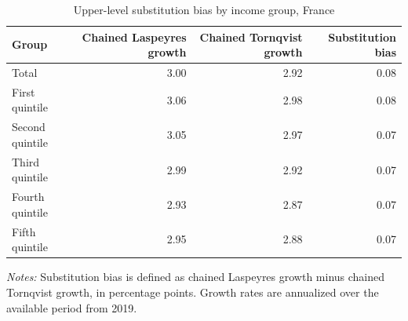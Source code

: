 \begin{table}

\caption{\label{tab:fr-substitution-bias}Upper-level substitution bias by income group, France}
\centering
\begin{tabular}[t]{lrrr}
\toprule
Group & Chained Laspeyres growth & Chained Tornqvist growth & Substitution bias\\
\midrule
Total & 3.00 & 2.92 & 0.08\\
First quintile & 3.06 & 2.98 & 0.08\\
Second quintile & 3.05 & 2.97 & 0.07\\
Third quintile & 2.99 & 2.92 & 0.07\\
Fourth quintile & 2.93 & 2.87 & 0.07\\
\addlinespace
Fifth quintile & 2.95 & 2.88 & 0.07\\
\bottomrule
\end{tabular}
\end{table}
\begin{flushleft}
\footnotesize{\emph{Notes:} Substitution bias is defined as chained Laspeyres growth minus chained Tornqvist growth, in percentage points. Growth rates are annualized over the available period from 2019.}
\end{flushleft}
